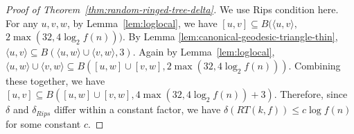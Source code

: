 \documentclass[11pt]{article}
\newtheorem{thm}{Theorem}
\begin{document}
\begin{proof}[Proof of Theorem~\ref{thm:random-ringed-tree-delta}]
We use Rips condition here. For any $u,v,w$, 
	by Lemma~\ref{lem:loglocal}, we have
	$[u,v] \subseteq B(\langle u,v \rangle,$ $ 2\max(32,4\log_2 f(n)))$.
By Lemma \ref{lem:canonical-geodesic-triangle-thin}, 
	$\langle u,v \rangle \subseteq B(\langle u,w \rangle \cup 
	\langle v,w \rangle , 3)$.
Again by Lemma~\ref{lem:loglocal}, 	$\langle u,w \rangle \cup 
	\langle v,w \rangle \subseteq B([u,w] \cup [v,w],2\max(32,4\log_2 f(n)))$.
Combining these together, we have
	$[u,v] \subseteq B([u,w] \cup [v,w],4\max(32,4\log_2 f(n))+3)$.
Therefore, since $\delta$ and $\delta_{Rips}$ differ within a constant factor, we have $\delta(RT(k,f)) \le c \log f(n)$ for some constant $c$.
\end{proof}



\end{document}
